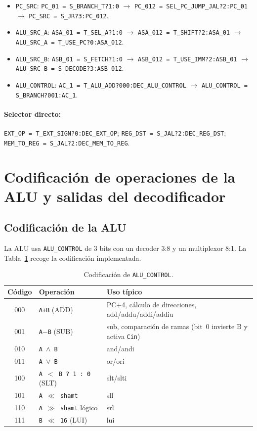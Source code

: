 \documentclass[11pt,a4paper]{article}
\begin{document}
\begin{itemize}
  \item \texttt{PC\_SRC}: \texttt{PC\_01 = S\_BRANCH\_T?1:0} $\rightarrow$ \texttt{PC\_012 = SEL\_PC\_JUMP\_JAL?2:PC\_01} $\rightarrow$ \texttt{PC\_SRC = S\_JR?3:PC\_012}.
  \item \texttt{ALU\_SRC\_A}: \texttt{ASA\_01 = T\_SEL\_A?1:0} $\rightarrow$ \texttt{ASA\_012 = T\_SHIFT?2:ASA\_01} $\rightarrow$ \texttt{ALU\_SRC\_A = T\_USE\_PC?0:ASA\_012}.
  \item \texttt{ALU\_SRC\_B}: \texttt{ASB\_01 = S\_FETCH?1:0} $\rightarrow$ \texttt{ASB\_012 = T\_USE\_IMM?2:ASB\_01} $\rightarrow$ \texttt{ALU\_SRC\_B = S\_DECODE?3:ASB\_012}.
  \item \texttt{ALU\_CONTROL}: \texttt{AC\_1 = T\_ALU\_ADD?000:DEC\_ALU\_CONTROL} $\rightarrow$ \texttt{ALU\_CONTROL = S\_BRANCH?001:AC\_1}.
\end{itemize}

\paragraph{Selector directo:}
\texttt{EXT\_OP = T\_EXT\_SIGN?0:DEC\_EXT\_OP}; \texttt{REG\_DST = S\_JAL?2:DEC\_REG\_DST}; \texttt{MEM\_TO\_REG = S\_JAL?2:DEC\_MEM\_TO\_REG}.

\section{Codificación de operaciones de la ALU y salidas del decodificador}

\subsection{Codificación de la ALU}

La ALU usa \texttt{ALU\_CONTROL} de 3 bits con un decoder 3:8 y un multiplexor 8:1. La Tabla~\ref{tab:alu} recoge la codificación implementada.

\begin{table}[htbp]
\centering
\caption{Codificación de \texttt{ALU\_CONTROL}.}
\label{tab:alu}
\begin{tabular}{@{}cll@{}}
\toprule
Código & Operación & Uso típico \\
\midrule
000 & \texttt{A+B} (ADD) & PC+4, cálculo de direcciones, add/addu/addi/addiu \\
001 & \texttt{A$-$B} (SUB) & sub, comparación de ramas (bit~0 invierte B y activa \texttt{Cin}) \\
010 & \texttt{A $\land$ B} & and/andi \\
011 & \texttt{A $\lor$ B} & or/ori \\
100 & \texttt{A $<$ B ? 1 : 0} (SLT) & slt/slti \\
101 & \texttt{A $\ll$ shamt} & sll \\
110 & \texttt{A $\gg$ shamt} lógico & srl \\
111 & \texttt{B $\ll$ 16} (LUI) & lui \\
\bottomrule
\end{tabular}
\end{table}
\end{document}
